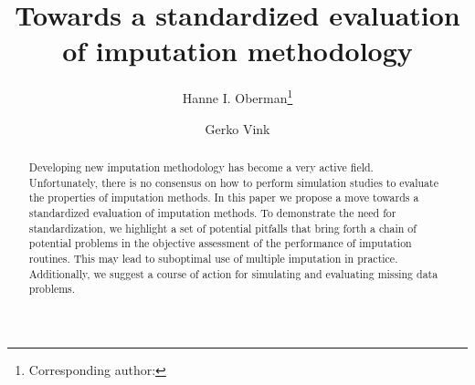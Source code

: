 \documentclass[bimj,fleqn]{w-art}
\theoremstyle{plain}
\theoremstyle{definition}
\begin{document}

\title[Standardized evaluation]{Towards a standardized evaluation of imputation methodology}
\author[Oberman]{Hanne I. Oberman\footnote{Corresponding author: {}}} 
\address[\inst{1}]{Departement of Methodology \& Statistics, Padualaan 14, 3584 CH Utrecht, The Netherlands}
\author[Vink]{Gerko Vink}
   

\begin{abstract}
Developing new imputation methodology has become a very active field. Unfortunately, there is no consensus on how to perform simulation studies to evaluate the properties of imputation methods. In this paper we propose a move towards a standardized evaluation of imputation methods. To demonstrate the need for standardization, we highlight a set of potential pitfalls that bring forth a chain of potential problems in the objective assessment of the performance of imputation routines. This may lead to suboptimal use of multiple imputation in practice. Additionally, we suggest a course of action for simulating and evaluating missing data problems.
\end{abstract}



\maketitle                   %



\end{document}
